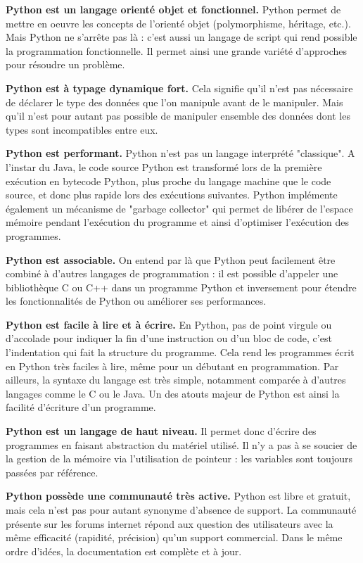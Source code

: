 \documentclass[12pt, a4paper]{article}
\begin{document}
\textbf{Python est un langage orienté objet et fonctionnel.} Python permet de mettre en oeuvre les concepts de l'orienté objet (polymorphisme, héritage, etc.). Mais Python ne s'arrête pas là : c'est aussi un langage de script qui rend possible la programmation fonctionnelle. Il permet ainsi une grande variété d'approches pour résoudre un problème.

\textbf{Python est à typage dynamique fort.} Cela signifie qu'il n'est pas nécessaire de déclarer le type des données que l'on manipule avant de le manipuler. Mais qu'il n'est pour autant pas possible de manipuler ensemble des données dont les types sont incompatibles entre eux.

\textbf{Python est performant.} Python n'est pas un langage interprété "classique". A l'instar du Java, le code source Python est transformé lors de la première exécution en bytecode Python, plus proche du langage machine que le code source, et donc plus rapide lors des exécutions suivantes. Python implémente également un mécanisme de "garbage collector" qui permet de libérer de l'espace mémoire pendant l'exécution du programme et ainsi d'optimiser l'exécution des programmes.

\textbf{Python est associable.} On entend par là que Python peut facilement être combiné à d'autres langages de programmation : il est possible d'appeler une bibliothèque C ou C++ dans un programme Python et inversement pour étendre les fonctionnalités de Python ou améliorer ses performances.

\textbf{Python est facile à lire et à écrire.} En Python, pas de point virgule ou d'accolade pour indiquer la fin d'une instruction ou d'un bloc de code, c'est l'indentation qui fait la structure du programme. Cela rend les programmes écrit en Python très faciles à lire, même pour un débutant en programmation. Par ailleurs, la syntaxe du langage est très simple, notamment comparée à d'autres langages comme le C ou le Java. Un des atouts majeur de Python est ainsi la facilité d'écriture d'un programme.

\textbf{Python est un langage de haut niveau.} Il permet donc d'écrire des programmes en faisant abstraction du matériel utilisé. Il n'y a pas à se soucier de la gestion de la mémoire via l'utilisation de pointeur : les variables sont toujours passées par référence.

\textbf{Python possède une communauté très active.} Python est libre et gratuit, mais cela n'est pas pour autant synonyme d'absence de support. La communauté présente sur les forums internet répond aux question des utilisateurs avec la même efficacité (rapidité, précision) qu'un support commercial. Dans le même ordre d'idées, la documentation est complète et à jour.
\end{document}
